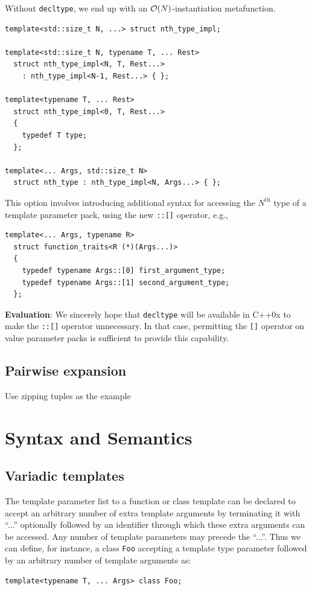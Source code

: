 \documentclass{article}
\begin{document}
Without \texttt{decltype}, we end up with an ${\cal
O}(N)$-instantiation metafunction.

\begin{verbatim}
template<std::size_t N, ...> struct nth_type_impl;

template<std::size_t N, typename T, ... Rest>
  struct nth_type_impl<N, T, Rest...>
    : nth_type_impl<N-1, Rest...> { };

template<typename T, ... Rest>
  struct nth_type_impl<0, T, Rest...>
  {
    typedef T type;
  };
  
template<... Args, std::size_t N>
  struct nth_type : nth_type_impl<N, Args...> { };
\end{verbatim}

This option involves introducing additional syntax for accessing the
$N^{\text{th}}$ type of a template parameter pack, using the new
\texttt{::[]} operator, e.g.,

\begin{verbatim}
template<... Args, typename R>
  struct function_traits<R (*)(Args...)>
  {
    typedef typename Args::[0] first_argument_type;
    typedef typename Args::[1] second_argument_type;
  };
\end{verbatim}

\textbf{Evaluation}: We sincerely hope that \texttt{decltype} will be
available in C++0x to make the \texttt{::[]} operator unnecessary. In
that case, permitting the \texttt{[]} operator on value parameter
packs is sufficient to provide this capability.

\subsection{Pairwise expansion}
Use zipping tuples as the example

\section{Syntax and Semantics}
\subsection{Variadic templates}
\par The template parameter list to a function or class template can
be declared to accept an arbitrary number of extra template arguments
by terminating it with ``...'' optionally followed by an identifier
through which these extra arguments can be accessed.
Any number of template
parameters may precede the ``...''. Thus we can define, for instance,
a class {\tt Foo} accepting a template type parameter followed by an
arbitrary number of template arguments as:
\begin{verbatim}
template<typename T, ... Args> class Foo;
\end{verbatim}
\end{document}
